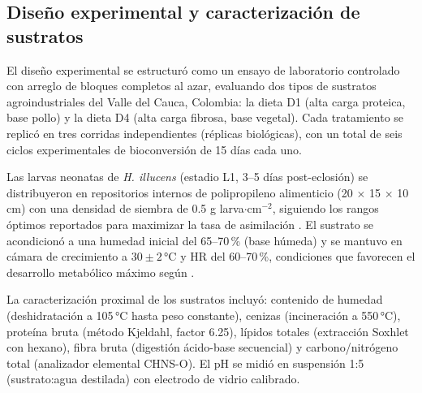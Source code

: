 

\subsection{Diseño experimental y caracterización de sustratos}
\label{subsec:cap2_diseno_sustratos}

El diseño experimental se estructuró como un ensayo de laboratorio
controlado con arreglo de bloques completos al azar, evaluando dos
tipos de sustratos agroindustriales del Valle del Cauca, Colombia:
la dieta D1 (alta carga proteica, base pollo) y la dieta D4 (alta
carga fibrosa, base vegetal). Cada tratamiento se replicó en tres
corridas independientes (réplicas biológicas), con un total de seis
ciclos experimentales de bioconversión de 15 días cada uno.

Las larvas neonatas de \textit{H. illucens} (estadio L1, 3--5 días
post-eclosión) se distribuyeron en repositorios internos de
polipropileno alimenticio (20 $\times$ 15 $\times$ 10 cm) con una
densidad de siembra de 0.5 g larva$\cdot$cm$^{-2}$, siguiendo los
rangos óptimos reportados para maximizar la tasa de asimilación
\autocite{nayakHermetiaIllucensDiptera2023}. El sustrato se
acondicionó a una humedad inicial del 65--70\,\% (base húmeda) y se
mantuvo en cámara de crecimiento a $30 \pm 2$\,°C y HR del 60--70\,\%,
condiciones que favorecen el desarrollo metabólico máximo según
\autocite{salamEffectDifferentEnvironmental2022}.

La caracterización proximal de los sustratos incluyó: contenido de
humedad (deshidratación a 105\,°C hasta peso constante), cenizas
(incineración a 550\,°C), proteína bruta (método Kjeldahl, factor
6.25), lípidos totales (extracción Soxhlet con hexano), fibra bruta
(digestión ácido-base secuencial) y carbono/nitrógeno total (analizador
elemental CHNS-O). El pH se midió en suspensión 1:5 (sustrato:agua
destilada) con electrodo de vidrio calibrado.

